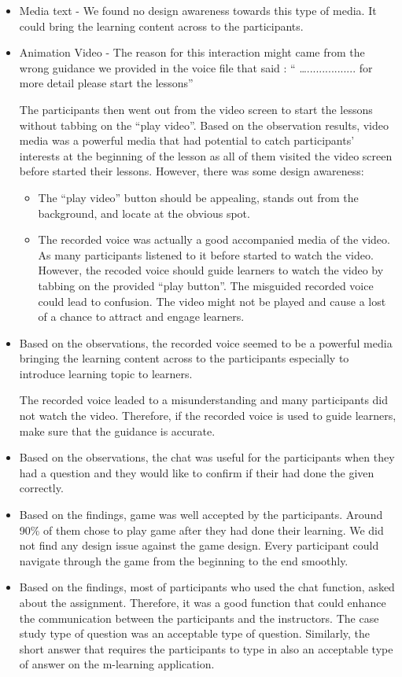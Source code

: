 \begin{itemize}
\item Media text - We found no design awareness towards this type of media. It could bring the learning content across to the participants. 
\item Animation Video - The reason for this interaction might came from the wrong guidance we provided in the voice file that said : 
`` …................ for more detail please start the lessons''

The participants then went out from the video screen to start the lessons without tabbing on the ``play video''. Based on the observation results, video media was a powerful media that had potential to catch participants' interests at the beginning of the lesson as all of them visited the video screen before started their lessons. However, there was some design awareness: 
\begin{itemize}
\item The ``play video'' button should be appealing, stands out from the background, and locate at the obvious spot.
\item The recorded voice was actually a good accompanied media of the video. As many participants listened to it before started to watch the video. However, the recoded voice should guide learners to watch the video by tabbing on the provided ``play button''. The misguided recorded voice could lead to confusion. The video might not be played and cause a lost of a chance to attract and engage learners. 
\end{itemize}

\item Based on the observations, the recorded voice seemed to be a powerful media bringing the learning content across to the participants especially to introduce learning topic to learners. 

The recorded voice leaded to a misunderstanding and many participants did not watch the video. Therefore, if the recorded voice is used to guide learners, make sure that the guidance is accurate. 

\item Based on the observations, the chat was useful for the participants when they had a question and they would like to confirm if their had done the given correctly. 

\item Based on the findings, game was well accepted by the participants. Around 90\% of them chose to play game after they had done their learning. We did not find any design issue against the game design. Every participant could navigate through the game from the beginning to the end smoothly. 

\item Based on the findings, most of participants who used the chat function, asked about the assignment. Therefore, it was a good function that could enhance the communication between the participants and the instructors. The case study type of question was an acceptable type of question. Similarly, the short answer that requires the participants to type in also an acceptable type of answer on the m-learning application. 

\end{itemize} 
